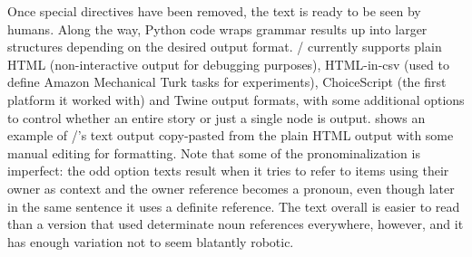 Once special directives have been removed, the text is ready to be seen by humans.
%
Along the way, Python code wraps grammar results up into larger structures depending on the desired output format.
%
\dunyazad/ currently supports plain HTML (non-interactive output for debugging purposes), HTML-in-csv (used to define Amazon Mechanical Turk tasks for experiments), ChoiceScript (the first platform it worked with) and Twine output formats, with some additional options to control whether an entire story or just a single node is output.
%
 shows an example of \dunyazad/'s text output copy-pasted from the plain HTML output with some manual editing for formatting.
%
Note that some of the pronominalization is imperfect: the odd option texts result when it tries to refer to items using their owner as context and the owner reference becomes a pronoun, even though later in the same sentence it uses a definite reference.
%
The text overall is easier to read than a version that used determinate noun references everywhere, however, and it has enough variation not to seem blatantly robotic.

